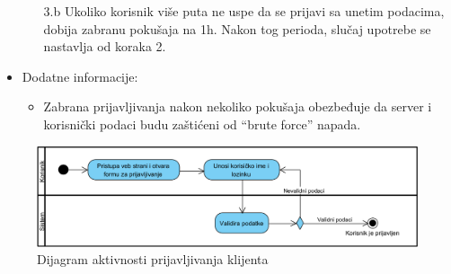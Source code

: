 \begin{itemize}
\begin{itemize}
            \item[3.b] Ukoliko korisnik više puta ne uspe da se prijavi sa unetim podacima, dobija zabranu pokušaja na 1h. Nakon tog perioda, slučaj upotrebe se nastavlja od koraka 2.
        \end{itemize}
    \item Dodatne informacije:
        \begin{itemize}
            \item Zabrana prijavljivanja nakon nekoliko pokušaja obezbeđuje da server i korisnički podaci budu zaštićeni od ``brute force'' napada.
        \end{itemize}
\end{itemize}

\begin{figure}[H]
\begin{center}
\includegraphics[width=\textwidth]{Pictures/activity_user_login.png}
\end{center}
    \caption{Dijagram aktivnosti prijavljivanja klijenta}
\label{fig:ActivityUserLogin}
\end{figure}
